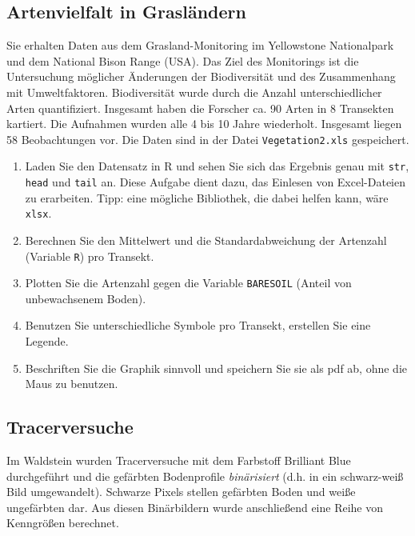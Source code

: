 \documentclass[]{book}
\begin{document}
\hypertarget{artenvielfalt-in-grasluxe4ndern}{%
\subsection{Artenvielfalt in Grasländern}\label{artenvielfalt-in-grasluxe4ndern}}

Sie erhalten Daten aus dem Grasland-Monitoring im Yellowstone Nationalpark und dem National Bison Range (USA). Das Ziel des Monitorings ist die Untersuchung möglicher Änderungen der Biodiversität und des Zusammenhang mit Umweltfaktoren. Biodiversität wurde durch die Anzahl unterschiedlicher Arten quantifiziert. Insgesamt haben die Forscher ca. 90 Arten in 8 Transekten kartiert. Die Aufnahmen wurden alle 4 bis 10 Jahre wiederholt. Insgesamt liegen 58 Beobachtungen vor. Die Daten sind in der Datei \texttt{Vegetation2.xls} gespeichert.

\begin{enumerate}
\def\labelenumi{\arabic{enumi}.}
\item
  Laden Sie den Datensatz in R und sehen Sie sich das Ergebnis genau mit \texttt{str}, \texttt{head} und \texttt{tail} an. Diese Aufgabe dient dazu, das Einlesen von Excel-Dateien zu erarbeiten. Tipp: eine mögliche Bibliothek, die dabei helfen kann, wäre \texttt{xlsx}.
\item
  Berechnen Sie den Mittelwert und die Standardabweichung der Artenzahl (Variable \texttt{R}) pro Transekt.
\item
  Plotten Sie die Artenzahl gegen die Variable \texttt{BARESOIL} (Anteil von unbewachsenem Boden).
\item
  Benutzen Sie unterschiedliche Symbole pro Transekt, erstellen Sie eine Legende.
\item
  Beschriften Sie die Graphik sinnvoll und speichern Sie sie als pdf ab, ohne die Maus zu benutzen.
\end{enumerate}

\hypertarget{tracerversuche}{%
\subsection{Tracerversuche}\label{tracerversuche}}

Im Waldstein wurden Tracerversuche mit dem Farbstoff Brilliant Blue durchgeführt und die gefärbten Bodenprofile \emph{binärisiert} (d.h. in ein schwarz-weiß Bild umgewandelt). Schwarze Pixels stellen gefärbten Boden und weiße ungefärbten dar. Aus diesen Binärbildern wurde anschließend eine Reihe von Kenngrößen berechnet.
\end{document}
